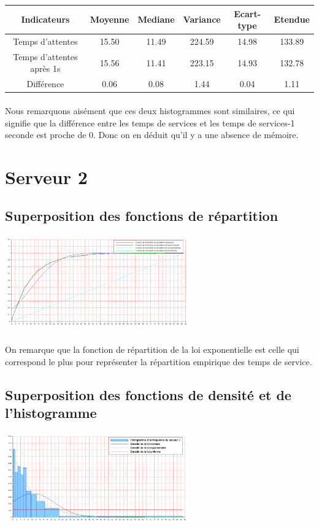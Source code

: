 \documentclass{article}
\begin{document}
\begin{center}
\begin{tabular}{|c|c|c|c|c|c|}
  \hline
  Indicateurs & Moyenne & Mediane & Variance & Ecart-type & Etendue \\
  \hline
  Temps d'attentes & 15.50 & 11.49 & 224.59 & 14.98 & 133.89 \\
  Temps d'attentes après 1s & 15.56 & 11.41 & 223.15 & 14.93 & 132.78 \\
  Différence & 0.06 & 0.08 & 1.44 & 0.04 & 1.11 \\
  \hline
\end{tabular}
\end{center}

\paragraph{}
Nous remarquons aisément que ces deux histogrammes sont similaires, ce qui signifie que la différence entre les temps de services et les temps de services-1 seconde est proche de 0. Donc on en déduit qu’il y a une absence de mémoire.

\section{Serveur 2}

\subsection{Superposition des fonctions de répartition}
\begin{center}
\includegraphics[width=300px]{img/S2_repartitions.png}
\end{center}
\paragraph{}
On remarque que la fonction de répartition de la loi exponentielle est celle qui correspond le plus pour représenter la répartition empirique des temps de service.

\subsection{Superposition des fonctions de densité et de l'histogramme}
\begin{center}
\includegraphics[width=300px]{img/S2_densite.png}
\end{center}
\end{document}
